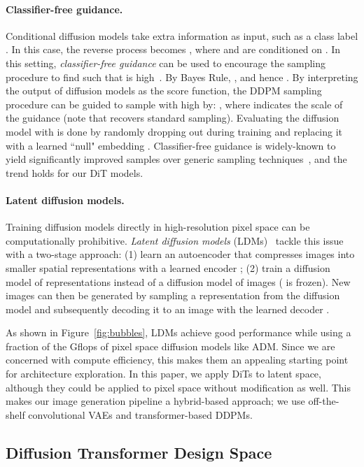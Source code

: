 \documentclass[10pt,twocolumn,letterpaper]{article}
\begin{document}
\paragraph{Classifier-free guidance.} Conditional diffusion models take extra information as input, such as a class label . In this case, the reverse process becomes , where  and  are conditioned on . In this setting, \textit{classifier-free guidance} can be used to encourage the sampling procedure to find  such that  is high~\cite{ho2021classifier}. By Bayes Rule, , and hence . By interpreting the output of diffusion models as the score function, the DDPM sampling procedure can be guided to sample  with high  by:
, where  indicates the scale of the guidance (note that  recovers standard sampling). Evaluating the diffusion model with  is done by randomly dropping out  during training and replacing it with a learned ``null" embedding . Classifier-free guidance is widely-known to yield significantly improved samples over generic sampling techniques~\cite{ho2021classifier,nichol2021glide,ramesh2022hierarchical}, and the trend holds for our DiT models.
\paragraph{Latent diffusion models.} 
Training diffusion models directly in high-resolution pixel space can be computationally prohibitive. \textit{Latent diffusion models} (LDMs)~\cite{rombach2021highresolution} tackle this issue with a two-stage approach: (1) learn an autoencoder that compresses images into smaller spatial representations with a learned encoder ; (2) train a diffusion model of representations  instead of a diffusion model of images  ( is frozen). New images can then be generated by sampling a representation  from the diffusion model and subsequently decoding it to an image with the learned decoder . 

As shown in Figure~\ref{fig:bubbles}, LDMs achieve good performance while using a fraction of the Gflops of pixel space diffusion models like ADM. Since we are concerned with compute efficiency, this makes them an appealing starting point for architecture exploration. In this paper, we apply DiTs to latent space, although they could be applied to pixel space without modification as well. This makes our image generation pipeline a hybrid-based approach; we use off-the-shelf convolutional VAEs and transformer-based DDPMs.

\subsection{Diffusion Transformer Design Space}
\end{document}
